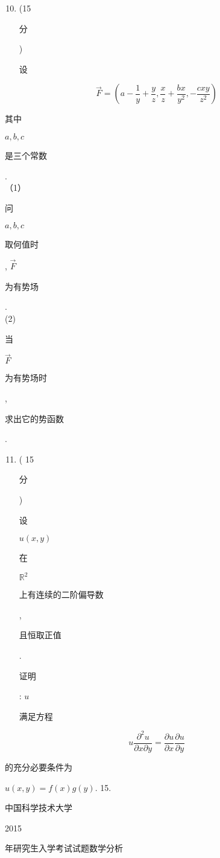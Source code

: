 \documentclass[10pt]{article}
\begin{document}
\begin{enumerate}
  \setcounter{enumi}{9}
  \item (15 \begin{CJK}{UTF8}{mj}分\end{CJK}) \begin{CJK}{UTF8}{mj}设\end{CJK}
\end{enumerate}
$$
\vec{F}=\left(a-\frac{1}{y}+\frac{y}{z}, \frac{x}{z}+\frac{b x}{y^{2}},-\frac{c x y}{z^{2}}\right)
$$
\begin{CJK}{UTF8}{mj}其中\end{CJK} $a, b, c$ \begin{CJK}{UTF8}{mj}是三个常数\end{CJK}.\\
（1）\begin{CJK}{UTF8}{mj}问\end{CJK} $a, b, c$ \begin{CJK}{UTF8}{mj}取何值时\end{CJK}, $\vec{F}$ \begin{CJK}{UTF8}{mj}为有势场\end{CJK}.\\
(2) \begin{CJK}{UTF8}{mj}当\end{CJK} $\vec{F}$ \begin{CJK}{UTF8}{mj}为有势场时\end{CJK}, \begin{CJK}{UTF8}{mj}求出它的势函数\end{CJK}.

\begin{enumerate}
  \setcounter{enumi}{10}
  \item ( 15 \begin{CJK}{UTF8}{mj}分\end{CJK}) \begin{CJK}{UTF8}{mj}设\end{CJK} $u(x, y)$ \begin{CJK}{UTF8}{mj}在\end{CJK} $\mathbb{R}^{2}$ \begin{CJK}{UTF8}{mj}上有连续的二阶偏导数\end{CJK}, \begin{CJK}{UTF8}{mj}且恒取正值\end{CJK}. \begin{CJK}{UTF8}{mj}证明\end{CJK}: $u$ \begin{CJK}{UTF8}{mj}满足方程\end{CJK}
\end{enumerate}
$$
u \frac{\partial^{2} u}{\partial x \partial y}=\frac{\partial u}{\partial x} \frac{\partial u}{\partial y}
$$
\begin{CJK}{UTF8}{mj}的充分必要条件为\end{CJK} $u(x, y)=f(x) g(y)$. 15. \begin{CJK}{UTF8}{mj}中国科学技术大学\end{CJK} 2015 \begin{CJK}{UTF8}{mj}年研究生入学考试试题数学分析\end{CJK}
\end{document}
